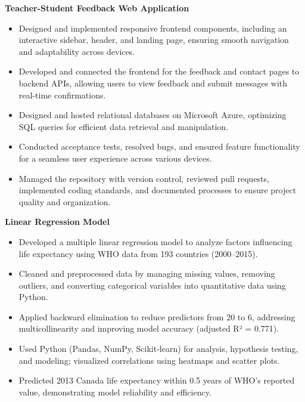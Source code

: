 \documentclass[10pt]{article}
\begin{document}
\textbf{Teacher-Student Feedback Web Application} 
\vspace{-4mm}
\begin{itemize}[left=0.15in, itemsep=0pt, label=--]
    \item Designed and implemented responsive frontend components, including an interactive sidebar, header, and landing page, ensuring smooth navigation and adaptability across devices.
    \item Developed and connected the frontend for the feedback and contact pages to backend APIs, allowing users to view feedback and submit messages with real-time confirmations.
    \item Designed and hosted relational databases on Microsoft Azure, optimizing SQL queries for efficient data retrieval and manipulation.
    \item Conducted acceptance tests, resolved bugs, and ensured feature functionality for a seamless user experience across various devices.
    \item Managed the repository with version control, reviewed pull requests, implemented coding standards, and documented processes to ensure project quality and organization.
\end{itemize}

\textbf{Linear Regression Model} 
\vspace{-4mm}
\begin{itemize}[left=0.15in, itemsep=0pt, label=--]
    \item Developed a multiple linear regression model to analyze factors influencing life expectancy using WHO data from 193 countries (2000–2015).
    \item Cleaned and preprocessed data by managing missing values, removing outliers, and converting categorical variables into quantitative data using Python.
    \item Applied backward elimination to reduce predictors from 20 to 6, addressing multicollinearity and improving model accuracy (adjusted R² = 0.771).
    \item Used Python (Pandas, NumPy, Scikit-learn) for analysis, hypothesis testing, and modeling; visualized correlations using heatmaps and scatter plots.
    \item Predicted 2013 Canada life expectancy within 0.5 years of WHO’s reported value, demonstrating model reliability and efficiency.
\end{itemize}

\end{document}
